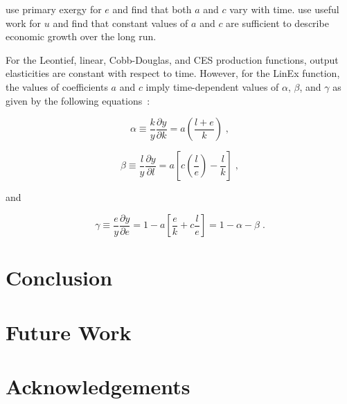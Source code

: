 \documentclass[preprint,authoryear,12pt]{elsarticle}
\begin{document}
\citet{Kummel:2010vz} use primary exergy for $e$ and find that 
both $a$ and $c$ vary with time.
\citet{Warr:2012cg} use useful work for $u$ and find that 
constant values of $a$ and $c$ are sufficient to describe economic growth 
over the long run. 

For the Leontief, linear, Cobb-Douglas, and CES production functions, 
output elasticities are constant with respect to time.
However, for the LinEx function, 
the values of coefficients $a$ and $c$ imply time-dependent
values of $\alpha$, $\beta$, and $\gamma$ as given by the following equations~\citep{Warr:2012cg}:

\begin{equation} \label{eq:LINEX_alpha}
  \alpha \equiv \frac{k}{y}\frac{\partial y}{\partial k} = a \left( \frac{l + e}{k} \right) \;,
\end{equation}

\begin{equation} \label{eq:LINEX_beta}
  \beta \equiv \frac{l}{y} \frac{\partial y}{\partial l} = a \left[ c \left( \frac{l}{e}\right) - \frac{l}{k} \right] \;,
\end{equation}

\noindent{}and

\begin{equation} \label{eq:LINEX_beta_2}
  \gamma \equiv \frac{e}{y} \frac{\partial y}{\partial e} 
         = 1 - a \left[ \frac{e}{k} + c \frac{l}{e} \right] 
         = 1 - \alpha - \beta \;.
\end{equation}


\section{Conclusion}
\label{sec:Conclusion}


\section{Future Work}
\label{sec:FutureWork}




\section*{Acknowledgements}
\label{sec:Acknowledgements}
\end{document}
